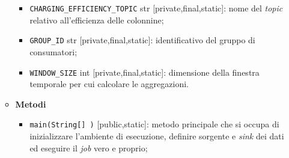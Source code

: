 \begin{itemize}
\begin{itemize}
\begin{itemize}
			            \item \texttt{CHARGING\_EFFICIENCY\_TOPIC} str [private,final,static]: nome del \textit{topic} relativo all'efficienza delle colonnine;
			            \item \texttt{GROUP\_ID} str [private,final,static]: identificativo del gruppo di consumatori;
			            \item \texttt{WINDOW\_SIZE} int [private,final,static]: dimensione della finestra temporale per cui calcolare le aggregazioni.
		            \end{itemize}
		      \item \textbf{Metodi}
		            \begin{itemize}
			            \item \texttt{main(String[] )} [public,static]: metodo principale che si occupa di inizializzare l'ambiente di esecuzione, definire sorgente e \textit{sink} dei dati ed eseguire il \textit{job} vero e proprio;


\end{itemize}
\end{itemize}
\end{itemize}
